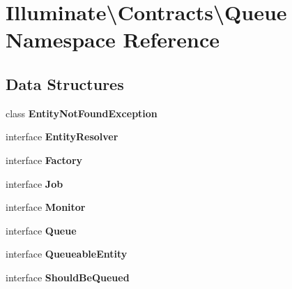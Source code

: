 \section{Illuminate\textbackslash{}Contracts\textbackslash{}Queue Namespace Reference}
\label{namespace_illuminate_1_1_contracts_1_1_queue}
\subsection*{Data Structures}
\begin{DoxyCompactItemize}
\item 
class {\bf Entity\+Not\+Found\+Exception}
\item 
interface {\bf Entity\+Resolver}
\item 
interface {\bf Factory}
\item 
interface {\bf Job}
\item 
interface {\bf Monitor}
\item 
interface {\bf Queue}
\item 
interface {\bf Queueable\+Entity}
\item 
interface {\bf Should\+Be\+Queued}
\end{DoxyCompactItemize}
